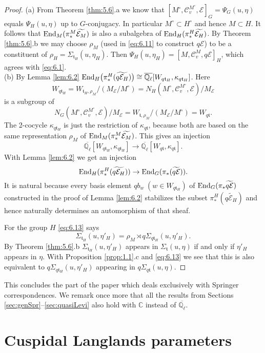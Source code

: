 \documentclass[11pt]{amsart}
\theoremstyle{definition}
\newcommand{\Q}{\mathbb Q}
\newcommand{\C}{\mathbb C}
\def\End{{\rm End}}
\def\cC{{\mathcal C}}
\def\cE{{\mathcal E}}
\def\ft{{\mathfrak t}}
\begin{document}
\begin{proof}
(a) From Theorem \ref{thm:5.6}.a we know that 
$[M^\circ,\cC_v^{M^\circ},\cE]_G = \Psi_G (u,\eta)$
equals $\Psi_H (u,\eta)$ up to $G$-conjugacy. In particular $M^\circ \subset H^\circ$
and hence $M \subset H$. It follows that $\End_M (\pi_*^M \widetilde{\cE_M})$ is also a
subalgebra of $\End_H (\pi_*^H \widetilde{\cE_H})$. By Theorem \ref{thm:5.6}.b we may choose
$\rho_M$ (used in \eqref{eq:6.11} to construct $q \cE$) to be a constituent of $\rho_H =
\Sigma_{\ft_H}(u,\eta_H)$. Then $\Psi_H (u,\eta_H) = [M,\cC_v^M,q \cE]_H$, which agrees with
\eqref{eq:6.1}. \\
(b) By Lemma \ref{lem:6.2} $\End_H \big( \pi_*^H (\widetilde{q \cE_H}) \big) \cong 
\overline{\Q_{\ell}} [W_{q \ft_H},\kappa_{q \ft_H}]$. Here
\[
W_{q \ft_H} = W_{\ft_H,\rho_M} / (M_\cE / M^\circ) = 
N_H (M^\circ,\cC_v^{M^\circ},\cE) / M_\cE 
\]
is a subgroup of
\[
N_G (M^\circ,\cC_v^{M^\circ},\cE) / M_\cE = W_{\ft,\rho_M} / (M_\cE / M^\circ) = W_{q \ft}.
\]
The 2-cocycle $\kappa_{q \ft_H}$ is just the restriction of $\kappa_{q \ft}$, because both
are based on the same representation $\rho_M$ of $\End_M (\pi_*^M \widetilde{\cE_M})$.
This gives an injection 
\[
\overline{\Q_{\ell}} [W_{q \ft_H},\kappa_{q \ft_H}] \to
\overline{\Q_{\ell}} [W_{q \ft},\kappa_{q \ft}] .
\]
With Lemma \ref{lem:6.2} we get an injection
\[
\End_H (\pi_*^H (\widetilde{q \cE_H})) \to \End_G (\pi_* (\widetilde{q \cE})) .
\]
It is natural because every basis element $q b_w \; (w \in W_{q \ft_H})$ of $\End_G (\pi_* 
\widetilde{q \cE})$ constructed in the proof of Lemma \ref{lem:6.2} stabilizes the subset
$\pi_*^H (\widetilde{q \cE_H})$ and hence naturally determines an automorphism of that sheaf.

For the group $H$ \eqref{eq:6.13} says 
\[
\Sigma_{\ft_H} (u,\eta'_H) = \rho_M \rtimes q\Sigma_{q \ft_H}(u,\eta'_H) .
\]
By Theorem \ref{thm:5.6}.b $\Sigma_{\ft_H} (u,\eta'_H)$ appears in $\Sigma_{\ft} (u,\eta)$
if and only if $\eta'_H$ appears in $\eta$. With Proposition \ref{prop:1.1}.c and 
\eqref{eq:6.13} we see that this is also equivalent to $q \Sigma_{q \ft_H}(u,\eta'_H)$ 
appearing in $q \Sigma_{q \ft}(u,\eta)$.
\end{proof}

This concludes the part of the paper which deals exclusively with Springer correspondences.
We remark once more that all the results from Sections \ref{sec:genSpr}--\ref{sec:quasiLevi} 
also hold with $\C$ instead of $\overline{\Q_{\ell}}$.


\section{Cuspidal Langlands parameters}
\end{document}
